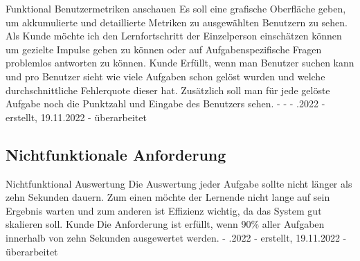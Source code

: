 \begin{myreq}
  \threeinline
    {}
    {\reqtype Funktional}
    {\reqevent Benutzermetriken anschauen}
  \reqdesc Es soll eine grafische Oberfläche geben, um akkumulierte und detaillierte Metriken zu ausgewählten Benutzern zu sehen.
  \reqrat Als Kunde möchte ich den Lernfortschritt der Einzelperson einschätzen können um gezielte Impulse geben zu können oder auf Aufgabenspezifische Fragen problemlos antworten zu können.
  \reqorig Kunde
  \reqfit Erfüllt, wenn man Benutzer suchen kann und pro Benutzer sieht wie viele Aufgaben schon gelöst wurden und welche durchschnittliche Fehlerquote dieser hat. Zusätzlich soll man für jede gelöste Aufgabe noch die Punktzahl und Eingabe des Benutzers sehen.
  \twoinline
    {}
    {}
  \twoinline
  {\reqdep -}
  {\reqconf -}
  \reqmater -
  .2022 - erstellt, 19.11.2022 - überarbeitet
\end{myreq}

\subsection*{Nichtfunktionale Anforderung}

\begin{myreq}
  
    \reqtype Nichtfunktional
    \reqevent Auswertung
  \reqdesc Die Auswertung jeder Aufgabe sollte nicht länger als zehn Sekunden dauern.
  \reqrat Zum einen möchte der Lernende nicht lange auf sein Ergebnis warten und zum anderen ist Effizienz wichtig, da das System gut skalieren soll.
  \reqorig Kunde 
  \reqfit Die Anforderung ist erfüllt, wenn 90\% aller Aufgaben innerhalb von zehn Sekunden ausgewertet werden.
  \twoinline
  \reqdep 
  \reqconf
  \reqmater - 
  .2022 - erstellt, 19.11.2022 - überarbeitet
\end{myreq}